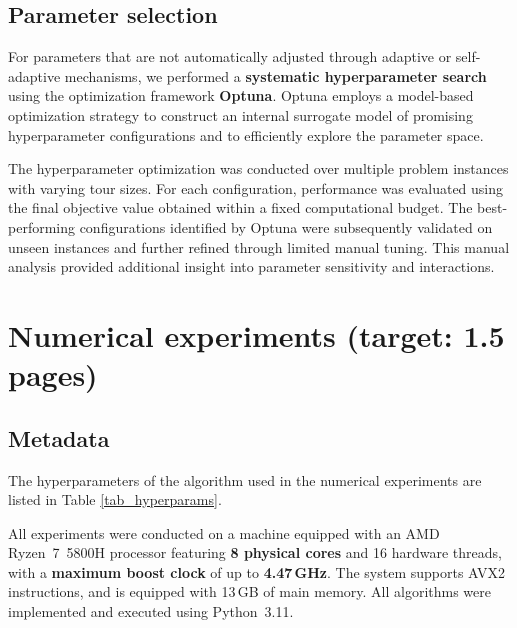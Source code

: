 \documentclass[a4paper,10pt]{article} %
\begin{document}
\subsection{Parameter selection}\label{sec_param_selec}
For parameters that are not automatically adjusted through adaptive or self-adaptive mechanisms, we performed a \textbf{systematic hyperparameter search} using the optimization framework \textbf{Optuna}. Optuna employs a model-based optimization strategy to construct an internal surrogate model of promising hyperparameter configurations and to efficiently explore the parameter space.

\noindent
The hyperparameter optimization was conducted over multiple problem instances with varying tour sizes. For each configuration, performance was evaluated using the final objective value obtained within a fixed computational budget. The best-performing configurations identified by Optuna were subsequently validated on unseen instances and further refined through limited manual tuning. This manual analysis provided additional insight into parameter sensitivity and interactions.


\section{Numerical experiments \hfill(target: 1.5 pages)}
\subsection{Metadata}\label{sec_metadata}
The hyperparameters of the algorithm used in the numerical experiments are listed in Table \ref{tab_hyperparams}.

\noindent
All experiments were conducted on a machine equipped with an AMD Ryzen~7~5800H processor featuring \textbf{8 physical cores} and 16 hardware threads, with a \textbf{maximum boost clock} of up to \textbf{4.47\,GHz}. The system supports AVX2 instructions, and is equipped with 13\,GB of main memory. All algorithms were implemented and executed using Python~3.11.
\end{document}
